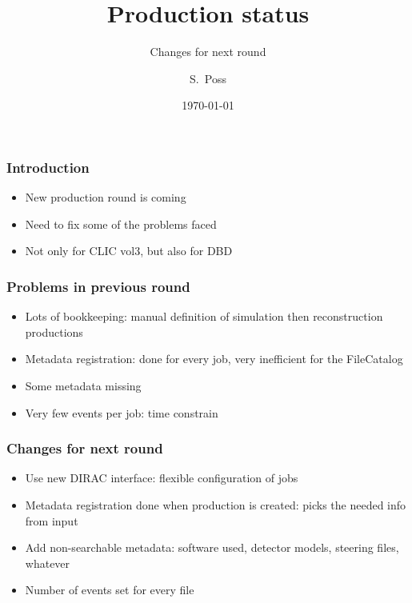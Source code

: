 \documentclass{beamer}
\title{Production status}
\subtitle{Changes for next round}
\author{S.~Poss}
\institute[CERN]
{%
CERN, Switzerland
}
\date{\today}
\begin{document}
\begin{frame}
\titlepage
\end{frame}

\begin{frame}
\frametitle{Introduction}
\begin{itemize}
  \item New production round is coming
  \item Need to fix some of the problems faced
  \item Not only for CLIC vol3, but also for DBD
\end{itemize}
\end{frame}

\begin{frame}
\frametitle{Problems in previous round}
\begin{itemize}
  \item Lots of bookkeeping: manual definition of simulation then reconstruction
  productions
  \item Metadata registration: done for every job, very inefficient for the
  FileCatalog
  \item Some metadata missing
  \item Very few events per job: time constrain
\end{itemize}
\end{frame}

\begin{frame}
\frametitle{Changes for next round}
\begin{itemize}
  \item Use new DIRAC interface: flexible configuration of jobs
  \item Metadata registration done when production is created: picks the needed
  info from input
  \item Add non-searchable metadata: software used, detector models, steering
  files, whatever
  \item Number of events set for every file
\end{itemize}
\end{frame}
\end{document}
